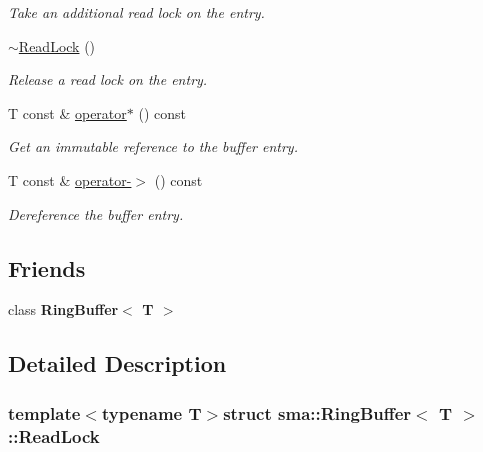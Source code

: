 \begin{DoxyCompactItemize}
\begin{DoxyCompactList}\small\item\em Take an additional read lock on the entry. \end{DoxyCompactList}\item 
\hyperlink{structsma_1_1RingBuffer_1_1ReadLock_a771beb471ed0f23e3daf4e0f28c0608c}{$\sim$\-Read\-Lock} ()
\begin{DoxyCompactList}\small\item\em Release a read lock on the entry. \end{DoxyCompactList}\item 
T const \& \hyperlink{structsma_1_1RingBuffer_1_1ReadLock_ae2b4e51206f8ad0bb2dad51906ee65df}{operator$\ast$} () const 
\begin{DoxyCompactList}\small\item\em Get an immutable reference to the buffer entry. \end{DoxyCompactList}\item 
\hypertarget{structsma_1_1RingBuffer_1_1ReadLock_a8f995ebf7df5e82f075711821ec5011b}{T const \& \hyperlink{structsma_1_1RingBuffer_1_1ReadLock_a8f995ebf7df5e82f075711821ec5011b}{operator-\/$>$} () const }\label{structsma_1_1RingBuffer_1_1ReadLock_a8f995ebf7df5e82f075711821ec5011b}

\begin{DoxyCompactList}\small\item\em Dereference the buffer entry. \end{DoxyCompactList}\end{DoxyCompactItemize}
\subsection*{Friends}
\begin{DoxyCompactItemize}
\item 
\hypertarget{structsma_1_1RingBuffer_1_1ReadLock_a5223a2ecf29b6a10addcb4673bc3806b}{class {\bfseries Ring\-Buffer$<$ T $>$}}\label{structsma_1_1RingBuffer_1_1ReadLock_a5223a2ecf29b6a10addcb4673bc3806b}

\end{DoxyCompactItemize}


\subsection{Detailed Description}
\subsubsection*{template$<$typename T$>$struct sma\-::\-Ring\-Buffer$<$ T $>$\-::\-Read\-Lock}

